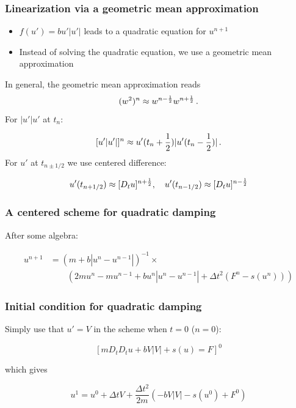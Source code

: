 \documentclass{beamer}
\begin{document}
\begin{frame}
\frametitle{Linearization via a geometric mean approximation}

\label{vib:ode2:fdm:fquad}

\begin{itemize}
 \item $f(u')=bu'|u'|$ leads to a quadratic equation for $u^{n+1}$

 \item Instead of solving the quadratic equation, we use a geometric mean
   approximation
\end{itemize}

\noindent
In general, the geometric mean approximation reads
\[ (w^2)^n \approx w^{n-\half}w^{n+\half}\tp\]
For $|u'|u'$ at $t_n$:

\[ [u'|u'|]^n \approx u'(t_n+{\half})|u'(t_n-{\half})|\tp\]
For $u'$ at $t_{n\pm 1/2}$ we use centered difference:

\[
u'(t_{n+1/2})\approx [D_t u]^{n+\half},\quad u'(t_{n-1/2})\approx [D_t u]^{n-\half}
\]
\end{frame}

\begin{frame}
\frametitle{A centered scheme for quadratic damping}

After some algebra:

\begin{align*}
u^{n+1} &=  \left( m + b|u^n-u^{n-1}|\right)^{-1}\times \\ 
& \qquad \left(2m u^n - mu^{n-1} + bu^n|u^n-u^{n-1}| + \Delta t^2 (F^n - s(u^n))
\right)
\end{align*}
\end{frame}

\begin{frame}
\frametitle{Initial condition for quadratic damping}

Simply use that $u'=V$ in the scheme when $t=0$ ($n=0$):

\[
[mD_tD_t u + bV|V| + s(u) = F]^0
\]

which gives

\[
u^1 = u^0 + \Delta t V + \frac{\Delta t^2}{2m}\left(-bV|V| - s(u^0) + F^0\right)
\]
\end{frame}
\end{document}
